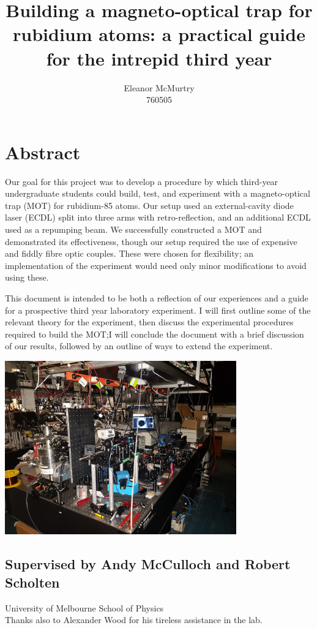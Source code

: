 \documentclass[11pt,twoside,a4paper]{article}
\author{Eleanor McMurtry\\760505}
\title{Building a magneto-optical trap for rubidium atoms: a practical guide for the intrepid third year}
\begin{document}
\maketitle
\section*{Abstract}
Our goal for this project was to develop a procedure by which third-year undergraduate students could
build, test, and experiment with a magneto-optical trap (MOT) for rubidium-85 atoms. Our setup used an external-cavity diode laser (ECDL)
split into three arms with retro-reflection, and an additional ECDL used as a repumping beam.
We successfully constructed a MOT and demonstrated its effectiveness, though our setup required the use of expensive and fiddly fibre optic couples.
These were chosen for flexibility; an implementation of the experiment would need only minor modifications
to avoid using these.

This document is intended to be both a reflection of our experiences and a guide for a prospective
third year laboratory experiment. I will first outline some of the relevant theory for the experiment,
then discuss the experimental procedures required to build the MOT;\@ I will conclude the document with a brief
discussion of our results, followed by an outline of ways to extend the experiment.

\begin{center}    
    \includegraphics[width=0.75\textwidth]{images/overview}
\subsection*{Supervised by Andy McCulloch and Robert Scholten}
University of Melbourne School of Physics\\
Thanks also to Alexander Wood for his tireless assistance in the lab.
\end{center}
\pagebreak
\tableofcontents
\vfill
\pagebreak
\end{document}
